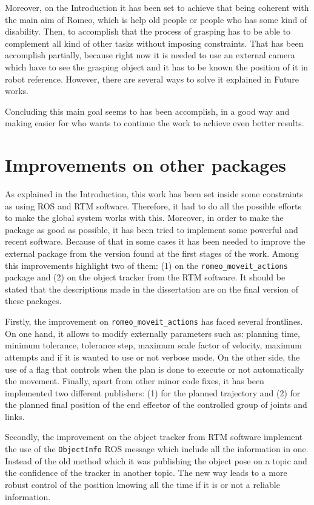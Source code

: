 \documentclass[12pt,a4paper,final,twoside,openright]{report}
\begin{document}
\break
Moreover, on the Introduction it has been set to achieve that being coherent with the main aim of Romeo, which is help old people or people who has some kind of disability. Then, to accomplish that the process of grasping has to be able to complement all kind of other tasks without imposing constraints. That has been accomplish partially, because right now it is needed to use an external camera which have to see the grasping object and it has to be known the position of it in robot reference. However, there are several ways to solve it explained in Future works.

Concluding this main goal seems to has been accomplish, in a good way and making easier for who wants to continue the work to achieve even better results.

\section{Improvements on other packages}

As explained in the Introduction, this work has been set inside some constraints as using ROS and RTM software. Therefore, it had to do all the possible efforts to make the global system works with this. Moreover, in order to make the package as good as possible, it has been tried to implement some powerful and recent software. Because of that in some cases it has been needed to improve the external package from the version found at the first stages of the work. Among this improvements highlight two of them: (1) on the \texttt{romeo\_moveit\_actions} package and (2) on the object tracker from the RTM software. It should be stated that the descriptions made in the dissertation are on the final version of these packages.

Firstly, the improvement on \texttt{romeo\_moveit\_actions} has faced several frontlines. On one hand, it allows to modify externally parameters such as: planning time, minimum tolerance, tolerance step, maximum scale factor of velocity, maximum attempts and if it is wanted to use or not verbose mode. On the other side, the use of a flag that controls when the plan is done to execute or not automatically the movement. Finally, apart from other minor code fixes, it has been implemented two different publishers: (1) for the planned trajectory and (2) for the planned final position of the end effector of the controlled group of joints and links.  

Secondly, the improvement on the object tracker from RTM software implement the use of the \texttt{ObjectInfo} ROS message which include all the information in one. Instead of the old method which it was publishing the object pose on a topic and the confidence of the tracker in another topic. The new way
leads to a more robust control of the position knowing all the time if it is or not a reliable information.
\end{document}
